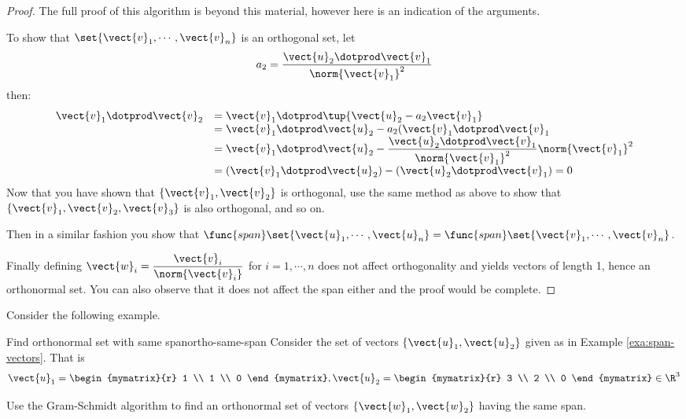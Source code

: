 \begin{proof}
The full proof of this algorithm is beyond this material, however here is an indication of the arguments. 

To show that  $\set{\vect{v}_1,\cdots , \vect{v}_n  } $ is an orthogonal set, let 
\[ a_2 =  \dfrac{ \vect{u}_2 \dotprod \vect{v}_1}{\norm{\vect{v}_1}^2} \]
then: 
\[
\begin{array}{ll}
 \vect{v}_1 \dotprod \vect{v}_2 &  =  \vect{v}_1 \dotprod \tup{\vect{u}_2 - a_2 \vect{v}_1 }  \\
 & = \vect{v}_1 \dotprod \vect{u}_2 - a_2 (\vect{v}_1 \dotprod \vect{v}_1  \\
 & = \vect{v}_1 \dotprod \vect{u}_2 - \dfrac{ \vect{u}_2 \dotprod \vect{v}_1}{\norm{\vect{v}_1}^2} \norm{\vect{v}_1}^2 \\
 & = ( \vect{v}_1 \dotprod \vect{u}_2 ) - ( \vect{u}_2 \dotprod \vect{v}_1 ) =0\\
\end{array}
\]
Now that you have shown that $\{\vect{v}_1, \vect{v}_2\}$ is orthogonal,  use the same method as above to show that 
$\{\vect{v}_1, \vect{v}_2, \vect{v}_3\}$ is also orthogonal,  and so on. 

Then in a similar fashion you show that $\func{span}\set{
\vect{u}_1,\cdots ,\vect{u}_n } = \func{span}\set{
\vect{v}_1,\cdots ,\vect{v}_n }$.

Finally defining $\vect{w}_i =
\dfrac{\vect{v}_i}{\norm{\vect{v}_i}}$ for $i=1, \cdots
,n$ does not affect orthogonality and yields vectors of length 1,
hence an orthonormal set. You can also observe that it does not affect
the span either and the proof would be complete.
\end{proof}

Consider the following example.

\begin{example}{Find orthonormal set with same span}{ortho-same-span}
Consider the set of vectors $\{\vect{u}_1, \vect{u}_2\}$ given as in Example \ref{exa:span-vectors}. That is  
\[
\vect{u}_1=\begin{mymatrix}{r}
1 \\
1 \\
0
\end{mymatrix}, \vect{u}_2=\begin{mymatrix}{r}
3 \\
2 \\
0
\end{mymatrix} \in \R^{3} 
\]

Use the Gram-Schmidt algorithm to find an orthonormal set of vectors $\{\vect{w}_1, \vect{w}_2\}$ having the same span.
\end{example}

